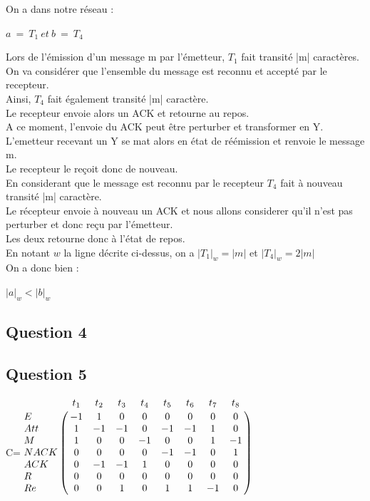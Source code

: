 On a dans notre réseau :
\begin{center}
  $a\ =\ T_1\ et\ b\ =\ T_4$
\end{center}

Lors de l'émission d'un message m par l'émetteur, $T_1$ fait transité |m| caractères.\\
On va considérer que l'ensemble du message est reconnu et accepté par le recepteur.\\
Ainsi, $T_4$ fait également transité |m| caractère.\\
Le recepteur envoie alors un ACK et retourne au repos.\\
A ce moment, l'envoie du ACK peut être perturber et transformer en Y. L'emetteur recevant un Y se mat alors en état de réémission et renvoie le message m.\\
Le recepteur le reçoit donc de nouveau.\\
En considerant que le message est reconnu par le recepteur $T_4$ fait à nouveau transité |m| caractère.\\
Le récepteur envoie à nouveau un ACK et nous allons considerer qu'il n'est pas perturber et donc reçu par l'émetteur.\\
Les deux retourne donc à l'état de repos.\\

En notant $w$ la ligne décrite ci-dessus, on a $|T_1|_w = |m|$ et $|T_4|_w = 2|m|$\\
On a donc bien :
\begin{center}
  $|a|_w < |b|_w$
\end{center}

\subsection{Question 4}


\subsection{Question 5}

\vspace{1cm}

\begin{center}

{\Huge C}\qquad =\qquad $\bordermatrix{
    &t_1 &t_2 &t_3 &t_4 &t_5 &t_6 &t_7 &t_8\cr
E   & -1& 1 & 0 & 0 & 0 & 0 & 0 & 0\cr
Att & 1 &-1 &-1 & 0 &-1 &-1 & 1 & 0\cr
M   & 1 & 0 & 0 &-1 & 0 & 0 & 1 &-1\cr
NACK& 0 & 0 & 0 & 0 &-1 &-1 & 0 & 1\cr
ACK & 0 &-1 &-1 & 1 & 0 & 0 & 0 & 0\cr
R   & 0 & 0 & 0 & 0 & 0 & 0 & 0 & 0\cr
Re  & 0 & 0 & 1 & 0 & 1 & 1 &-1 & 0\cr
}$

\end{center}

